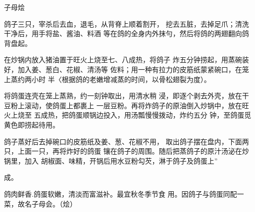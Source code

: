 \begin{recipe}{子母烩}

\ingredients


\cooking

\step 鸽子三只，宰杀后去血，退毛，从背脊上顺着割开， 挖去五脏，去掉足爪；清洗干净后，用手将盐、酱油、料酒 等在鸽的全身内外抹勻，然后将鸽的两翅翻向鸽背盘起。

在炒锅内放入猪油置于旺火上烧至七、八成热，将鸽子 炸五分钟捞起，用蒸碗装好，加入姜、葱白、花椒、清汤等 佐料；用一种有拉力的皮筋纸蒙紧碗口，在笼上蒸约两小时 半〈根据鸽的老嫩增减蒸的时间，以骨松翅裂为度）。

\step 将鸽蛋连壳在笼上蒸熟，约一刻钟取出，用清水稍 浸，即逐个剥去外壳，放在干豆粉上滚动，使鸽蛋上都裹上 一层豆粉。再将炸鸽子的原油倒入炒锅中，放在旺火上烧至 五成热，把鸽蛋顺锅边投入，用汤瓢慢慢拨动，炸约五分 钟，至鸽蛋觅黄色即捞起待用。

\step 鸽子蒸好后去掉碗口的皮筋纸及姜、葱、花椒不用， 取出鸽子摆在盘内，下面两只，上面一只，再将炸好的鸽蛋 镶在鸽子的周围。随后把蒸鸽子的原汁汤泌在炒锅里，加入 胡椒面、味精，开锅后用水豆粉勾芡，淋于鸽子及鸽蛋上”

成。

\notes

鸽肉鲜香.鸽蛋软嫩，清淡而富滋补。最宜秋冬季节食 用。因鸽子与鸽蛋同配一菜，故名子母会。（烩）

\end{recipe}

